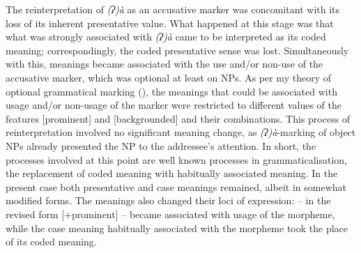 \documentclass[output=paper]{LSP/langsci}
\begin{document}
The reinterpretation of \textit{(ʔ)à} as an accusative marker was concomitant with its loss of its inherent presentative value. What happened at this stage was that what was strongly associated with \textit{(ʔ)à} came to be interpreted as its coded meaning; correspondingly, the coded presentative sense was lost. Simultaneously with this, meanings became associated with the use and/or non-use of the accusative marker, which was optional at least on  NPs. As per my theory of optional grammatical marking (\citealt{McGregor2013Optionality}), the meanings that could be associated with usage and/or non-usage of the marker were restricted to different values of the features [prominent] and [backgrounded] and their combinations. This process of reinterpretation involved no significant meaning change, as \textit{(ʔ)à}-marking of object NPs already presented the NP to the addressee’s attention. In short, the processes involved at this point are well known processes in grammaticalisation, the replacement of coded meaning with habitually associated meaning. In the present case both presentative and case meanings remained, albeit in somewhat modified forms. The meanings also changed their loci of expression:  – in the revised form [+prominent] – became associated with usage of the morpheme, while the case meaning habitually associated with the morpheme took the place of its coded meaning.
\end{document}
